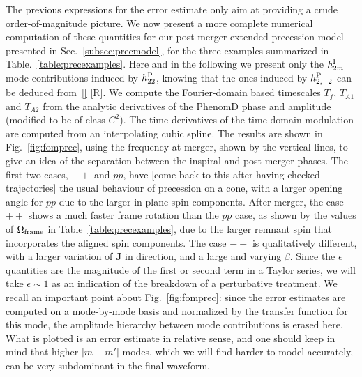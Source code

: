 \documentclass[aps,showpacs,twocolumn,
prd,superscriptaddress,nofootinbib]{revtex4-1}
\newcommand{\Tf}{T_{f}}
\newcommand{\SM}[1]{{\color{Red} #1}}
\begin{document}
The previous expressions for the error estimate only aim at providing a crude order-of-magnitude picture. We now present a more complete numerical computation of these quantities for our post-merger extended precession model presented in Sec.~\ref{subsec:precmodel}, for the three examples summarized in Table.~\ref{table:precexamples}. Here and in the following we present only the $h^{\rm I}_{2 m}$ mode contributions induced by $h^{\rm P}_{22}$, knowing that the ones induced by $h^{\rm P}_{2,-2}$ can be deduced from~\eqref{} \SM{[R]}. We compute the Fourier-domain based timescales $\Tf$, $T_{A1}$ and $T_{A2}$ from the analytic derivatives of the PhenomD phase and amplitude (modified to be of class $C^{2}$). The time derivatives of the time-domain modulation are computed from an interpolating cubic spline. The results are shown in Fig.~\ref{fig:fomprec}, using the frequency at merger, shown by the vertical lines, to give an idea of the separation between the inspiral and post-merger phases. The first two cases, $++$ and $pp$, have \SM{[come back to this after having checked trajectories]} the usual behaviour of precession on a cone, with a larger opening angle for $pp$ due to the larger in-plane spin components. After merger, the case $++$ shows a much faster frame rotation than the $pp$ case, as shown by the values of $\Omega_{\rm frame}$ in Table~\ref{table:precexamples}, due to the larger remnant spin that incorporates the aligned spin components. The case $--$ is qualitatively different, with a larger variation of $\bm{J}$ in direction, and a large and varying $\beta$. Since the $\epsilon$ quantities are the magnitude of the first or second term in a Taylor series, we will take $\epsilon \sim 1$ as an indication of the breakdown of a perturbative treatment. We recall an important point about Fig.~\ref{fig:fomprec}: since the error estimates are computed on a mode-by-mode basis and normalized by the transfer function for this mode, the amplitude hierarchy between mode contributions is erased here. What is plotted is an error estimate in relative sense, and one should keep in mind that higher $|m-m'|$ modes, which we will find harder to model accurately, can be very subdominant in the final waveform.
\end{document}
